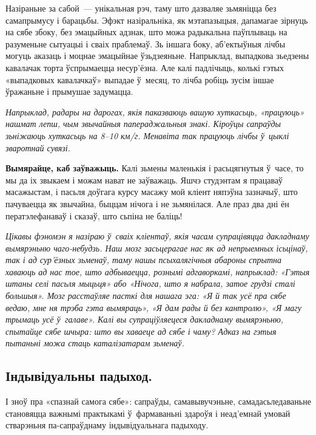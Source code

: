 Назіраньне за сабой~--- унікальная рэч, таму што дазваляе зьмяніцца без самапрымусу і барацьбы. Эфэкт назіральніка, як мэтапазыцыя, дапамагае зірнуць на сябе збоку, без эмацыйных адзнак, што можа радыкальна паўплываць на разуменьне сытуацыі і сваіх праблемаў. Зь іншага боку, аб'ектыўныя лічбы могуць аказаць і моцнае эмацыйнае ўзьдзеяньне. Напрыклад, выпадкова зьедзены кавалачак торта ўспрымаецца несур'ёзна. Але калі падлічыць, колькі гэтых «выпадковых кавалачкаў» выпадае ў~месяц, то лічба робіць зусім іншае ўражаньне і прымушае задумацца.

\emph{Напрыклад, радары на дарогах, якія паказваюць вашую хуткасьць, «працуюць» нашмат лепш, чым звычайныя папераджальныя знакі. Кіроўцы сапраўды зьніжаюць хуткасьць на 8--10 км/г. Менавіта так працуюць лічбы ў~цыклі зваротнай сувязі.}

\textbf{Вымярайце, каб заўважыць.} Калі зьмены маленькія і расьцягнутыя ў~часе, то мы да іх звыкаем і можам нават не заўважаць. Яшчэ студэнтам я працаваў масажыстам, і пасьля доўгага курсу масажу мой кліент няпэўна зазначыў, што пачуваецца як звычайна, быццам нічога і не зьмянілася. Але праз два дні ён ператэлефанаваў і сказаў, што сьпіна не баліць! 


\emph{Цікавы фэномэн я назіраю ў~сваіх кліентаў, якія часам супрацівяцца дакладнаму вымярэньню чаго-небудзь. Наш мозг засьцерагае нас як ад непрыемных ісьцінаў, так і ад сур'ёзных зьменаў, таму нашы псыхалягічныя абароны спрытна хаваюць ад нас тое, што адбываецца, рознымі адгаворкамі, напрыклад: «Гэтыя штаны селі пасьля мыцьця» або «Нічога, што я набрала, затое грудзі сталі большыя». Мозг расстаўляе пасткі для нашага эга: «Я й так усё пра сябе ведаю, мне ня трэба гэта вымяраць», «Я дам рады й без кантролю», «Я магу трымаць усё ў~галаве». Калі вы супраціўляецеся дакладнаму вымярэньню, спытайце сябе шчыра: што вы хаваеце ад сябе і чаму? Адказ на гэтыя пытаньні можа стаць каталізатарам зьменаў.}

\subsection*{Індывідуальны падыход.}

І зноў пра «спазнай самога сябе»: сапраўды, самавывучэньне, самадасьледаваньне становяцца важнымі практыкамі ў~фармаваньні здароўя і неад'емнай умовай стварэньня па-сапраўднаму індывідуальнага падыходу.

